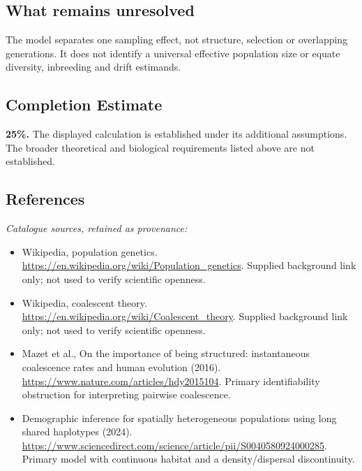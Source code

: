\documentclass[11pt]{article}
\begin{document}
\subsection{What remains unresolved}
The model separates one sampling effect, not structure, selection or overlapping generations. It does not identify a universal effective population size or equate diversity, inbreeding and drift estimands.
\subsection{Completion Estimate}
\textbf{25\%.} The displayed calculation is established under its additional assumptions. The broader theoretical and biological requirements listed above are not established.
\subsection{References}
\noindent\emph{Catalogue sources, retained as provenance:}
\begin{itemize}
\item Wikipedia, population genetics. \url{https://en.wikipedia.org/wiki/Population_genetics}. Supplied background link only; not used to verify scientific openness.
\item Wikipedia, coalescent theory. \url{https://en.wikipedia.org/wiki/Coalescent_theory}. Supplied background link only; not used to verify scientific openness.
\item Mazet et al., On the importance of being structured: instantaneous coalescence rates and human evolution (2016). \url{https://www.nature.com/articles/hdy2015104}. Primary identifiability obstruction for interpreting pairwise coalescence.
\item Demographic inference for spatially heterogeneous populations using long shared haplotypes (2024). \url{https://www.sciencedirect.com/science/article/pii/S0040580924000285}. Primary model with continuous habitat and a density/dispersal discontinuity.
\end{itemize}
\end{document}
